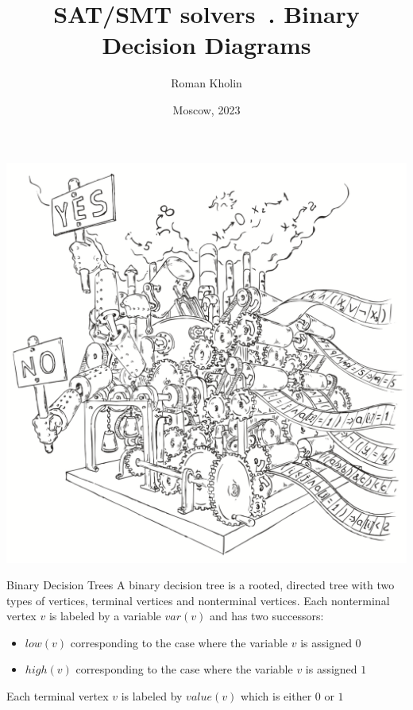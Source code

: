 \documentclass{beamer}
\begin{document}
\title{SAT/SMT solvers\ . Binary Decision Diagrams}
\author{Roman Kholin}
\date{Moscow, 2023}

\begin{frame}
\includegraphics[scale=0.5]{../decision-procedure.png}
\end{frame}

\frame{\titlepage}

\begin{frame}{Binary Decision Trees}
A binary decision tree is a rooted, directed tree with two types of vertices, terminal vertices and nonterminal vertices.\newline
Each nonterminal vertex $v$ is labeled by a variable $var(v)$ and has two successors:\newline
\begin{itemize}
\item $low(v)$ corresponding to the case where the variable $v$ is assigned $0$
\item $high(v)$ corresponding to the case where the variable $v$ is assigned $1$
\end{itemize}
Each terminal vertex $v$ is labeled by $value(v)$ which is either $0$ or $1$
\end{frame}
\end{document}
